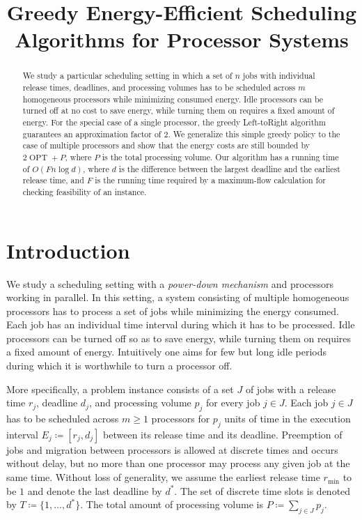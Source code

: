 \documentclass[a4paper]{article}
\title{Greedy Energy-Efficient Scheduling Algorithms for Processor Systems}
\DeclareMathOperator{\OPT}{OPT}
\begin{document}
%

\begin{abstract}
  We study a particular scheduling setting in which a set of $n$ jobs with individual release times, deadlines, and processing volumes has to be scheduled across $m$ homogeneous processors while minimizing consumed energy.
  Idle processors can be turned off at no cost to save energy, while turning them on requires a fixed amount of energy.
  For the special case of a single processor, the greedy Left-toRight algorithm guarantees an approximation factor of $2$.
  We generalize this simple greedy policy to the case of multiple processors and show that the energy costs are still bounded by $2 \OPT + P$, where $P$ is the total processing volume.
  Our algorithm has a running time of $O(F n \log d)$, where $d$ is the difference between the largest deadline and the earliest release time, and $F$ is the running time required by a maximum-flow calculation for checking feasibility of an instance.
\end{abstract}

\tableofcontents

\section{Introduction}

We study a scheduling setting with a \emph{power-down mechanism} and processors working in parallel.
In this setting, a system consisting of multiple homogeneous processors has to process a set of jobs while minimizing the energy consumed.
Each job has an individual time interval during which it has to be processed.
Idle processors can be turned off so as to save energy, while turning them on requires a fixed amount of energy.
Intuitively one aims for few but long idle periods during which it is worthwhile to turn a processor off.

More specifically, a problem instance consists of a set $J$ of jobs with a release time $r_j$, deadline $d_j$, and processing volume $p_j$ for every job $j \in J$.
Each job $j \in J$ has to be scheduled across $m \geq 1$ processors for $p_j$ units of time in the execution interval $E_j \coloneqq [r_j, d_j]$ between its release time and its deadline.
Preemption of jobs and migration between processors is allowed at discrete times and occurs without delay, but no more than one processor may process any given job at the same time.
Without loss of generality, we assume the earliest release time $r_{\min}$ to be $1$ and denote the last deadline by $d^*$.
The set of discrete time slots is denoted by $T \coloneqq \{1, \ldots, d^*\}$.
The total amount of processing volume is $P \coloneqq \sum_{j \in J} p_j$.
\end{document}
